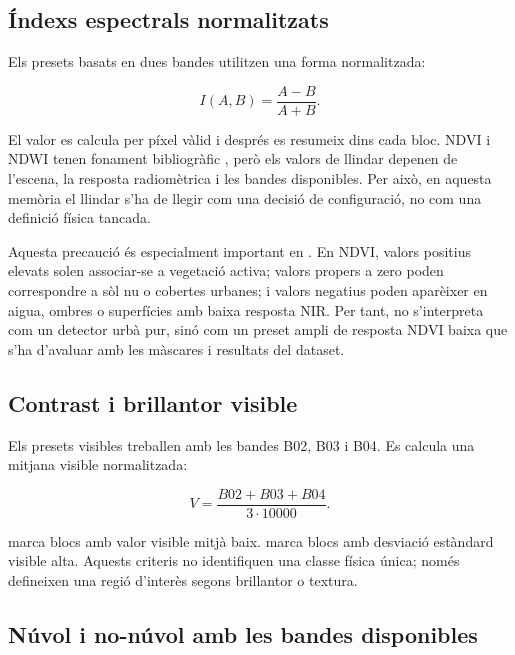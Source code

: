 \subsection{Índexs espectrals normalitzats}

Els presets basats en dues bandes utilitzen una forma normalitzada:

\begin{equation}
I(A,B)=\frac{A-B}{A+B}.
\label{eq:index}
\end{equation}

El valor es calcula per píxel vàlid i després es resumeix dins cada bloc. NDVI i
NDWI tenen fonament bibliogràfic \cite{rouse1974ndvi,mcfeeters1996ndwi}, però
els valors de llindar depenen de l'escena, la resposta radiomètrica i les bandes
disponibles. Per això, en aquesta memòria el llindar s'ha de llegir com una
decisió de configuració, no com una definició física tancada.

Aquesta precaució és especialment important en . En NDVI,
valors positius elevats solen associar-se a vegetació activa; valors propers a
zero poden correspondre a sòl nu o cobertes urbanes; i valors negatius poden
aparèixer en aigua, ombres o superfícies amb baixa resposta NIR. Per tant,
 no s'interpreta com un detector urbà pur, sinó com un preset
ampli de resposta NDVI baixa que s'ha d'avaluar amb les màscares i resultats del
dataset.

\subsection{Contrast i brillantor visible}

Els presets visibles treballen amb les bandes B02, B03 i B04. Es calcula una
mitjana visible normalitzada:

\begin{equation}
V=\frac{B02+B03+B04}{3\cdot10000}.
\end{equation}

 marca blocs amb valor visible mitjà baix.
 marca blocs amb desviació estàndard visible alta. Aquests
criteris no identifiquen una classe física única; només defineixen una regió
d'interès segons brillantor o textura.

\subsection{Núvol i no-núvol amb les bandes disponibles}

